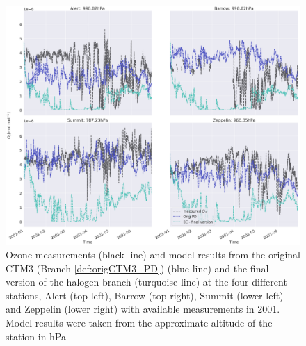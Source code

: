 \begin{figure}[h]
    \centering
    \includegraphics[width = \linewidth]{Chapter6_Results/images/ozone_stationComp_2001/ozone_2001_step5.png}
    \caption{Ozone measurements (black line) and model results from the original CTM3 (Branch \ref{def:origCTM3_PD}) (blue line) and the final version of the halogen branch (turquoise line) at the four different stations, Alert (top left), Barrow (top right), Summit (lower left) and Zeppelin (lower right) with available measurements in 2001. Model results were taken from the approximate altitude of the station in hPa}
    \label{fig:step5}
\end{figure}